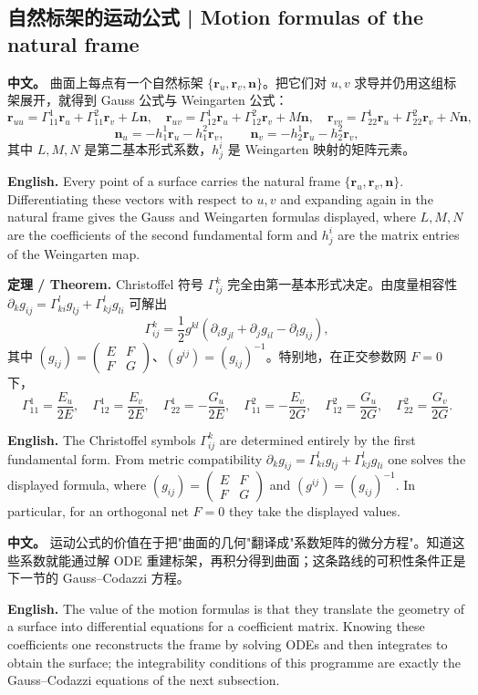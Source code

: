 \documentclass[UTF8,11pt,a4paper]{ctexart}
\newcommand{\APS}[2]{\par\noindent\textbf{中文。} #1\par\noindent\textbf{English.} #2\par\smallskip}
\newcommand{\EN}[1]{\par\noindent \textbf{English.} #1\par}
\newcommand{\THM}[2]{\par\noindent\textbf{定理 / Theorem.} #1\par\EN{#2}\par\smallskip}
\newcommand{\br}{\mathbf{r}}
\newcommand{\bn}{\mathbf{n}}
\begin{document}
\subsection{自然标架的运动公式 | Motion formulas of the natural frame}
\APS{曲面上每点有一个自然标架 $\{\br_u,\br_v,\bn\}$。把它们对 $u,v$ 求导并仍用这组标架展开，就得到 Gauss 公式与 Weingarten 公式：
\[
\br_{uu}=\Gamma^1_{11}\br_u+\Gamma^2_{11}\br_v+L\bn,\quad
\br_{uv}=\Gamma^1_{12}\br_u+\Gamma^2_{12}\br_v+M\bn,\quad
\br_{vv}=\Gamma^1_{22}\br_u+\Gamma^2_{22}\br_v+N\bn,
\]
\[
\bn_u=-h^1_1\br_u-h^2_1\br_v,\qquad
\bn_v=-h^1_2\br_u-h^2_2\br_v,
\]
其中 $L,M,N$ 是第二基本形式系数，$h^i_j$ 是 Weingarten 映射的矩阵元素。}{Every point of a surface carries the natural frame $\{\br_u,\br_v,\bn\}$. Differentiating these vectors with respect to $u,v$ and expanding again in the natural frame gives the Gauss and Weingarten formulas displayed, where $L,M,N$ are the coefficients of the second fundamental form and $h^i_j$ are the matrix entries of the Weingarten map.}
\THM{Christoffel 符号 $\Gamma^k_{ij}$ 完全由第一基本形式决定。由度量相容性 $\partial_k g_{ij}=\Gamma^l_{ki}g_{lj}+\Gamma^l_{kj}g_{li}$ 可解出
\[
\Gamma^k_{ij}=\frac12 g^{kl}\left(\partial_i g_{jl}+\partial_j g_{il}-\partial_l g_{ij}\right),
\]
其中 $(g_{ij})=\begin{pmatrix}E&F\\F&G\end{pmatrix}$、$(g^{ij})=(g_{ij})^{-1}$。特别地，在正交参数网 $F=0$ 下，
\[
\Gamma^1_{11}=\frac{E_u}{2E},\quad \Gamma^1_{12}=\frac{E_v}{2E},\quad \Gamma^1_{22}=-\frac{G_u}{2E},\quad
\Gamma^2_{11}=-\frac{E_v}{2G},\quad \Gamma^2_{12}=\frac{G_u}{2G},\quad \Gamma^2_{22}=\frac{G_v}{2G}.
\]
}{The Christoffel symbols $\Gamma^k_{ij}$ are determined entirely by the first fundamental form. From metric compatibility $\partial_k g_{ij}=\Gamma^l_{ki}g_{lj}+\Gamma^l_{kj}g_{li}$ one solves the displayed formula, where $(g_{ij})=\begin{pmatrix}E&F\\F&G\end{pmatrix}$ and $(g^{ij})=(g_{ij})^{-1}$. In particular, for an orthogonal net $F=0$ they take the displayed values.}
\APS{运动公式的价值在于把"曲面的几何"翻译成"系数矩阵的微分方程"。知道这些系数就能通过解 ODE 重建标架，再积分得到曲面；这条路线的可积性条件正是下一节的 Gauss--Codazzi 方程。}{The value of the motion formulas is that they translate the geometry of a surface into differential equations for a coefficient matrix. Knowing these coefficients one reconstructs the frame by solving ODEs and then integrates to obtain the surface; the integrability conditions of this programme are exactly the Gauss--Codazzi equations of the next subsection.}
\end{document}

